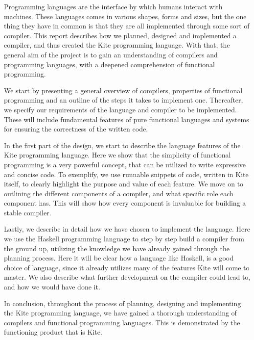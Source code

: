 
Programming languages are the interface by which humans interact with machines. These languages comes in various shapes, forms and sizes, but the one thing they have in common is that they are all implemented through some sort of compiler. This report describes how we planned, designed and implemented a compiler, and thus created the Kite programming language. With that, the general aim of the project is to gain an understanding of compilers and programming languages, with a deepened comprehension of functional programming.

We start by presenting a general overview of compilers, properties of functional programming and an outline of the steps it takes to implement one. Thereafter, we specify our requirements of the language and compiler to be implemented. These will include fundamental features of pure functional languages and systems for ensuring the correctness of the written code.

In the first part of the design, we start to describe the language features of the Kite programming language. Here we show that the simplicity of functional programming is a very powerful concept, that can be utilized to write expressive and concise code. To exemplify, we use runnable snippets of code, written in Kite itself, to clearly highlight the purpose and value of each feature. We move on to outlining the different components of a compiler, and what specific role each component has. This will show how every component is invaluable for building a stable compiler.

Lastly, we describe in detail how we have chosen to implement the language. Here we use the Haskell programming language to step by step build a compiler from the ground up, utilizing the knowledge we have already gained through the planning process. Here it will be clear how a language like Haskell, is a good choice of language, since it already utilizes many of the features Kite will come to master. We also describe what further development on the compiler could lead to, and how we would have done it.

In conclusion, throughout the process of planning, designing and implementing the Kite programming language, we have gained a thorough understanding of compilers and functional programming languages. This is demonstrated by the functioning product that is Kite.
